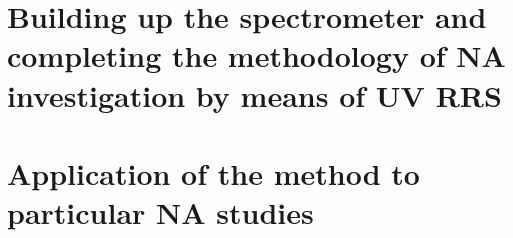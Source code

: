 \chapter[%
	Building up the spectrometer and completing the methodology of NA
	investigation by means of UV RRS
]{%
	Building up the spectrometer and completing the methodology of NA
	investigation by means of UV RRS
}
\label{spectrometer_building}








\chapter[%
	Application of the method to particular NA studies
]{%
	Application of the method to particular NA studies
}




